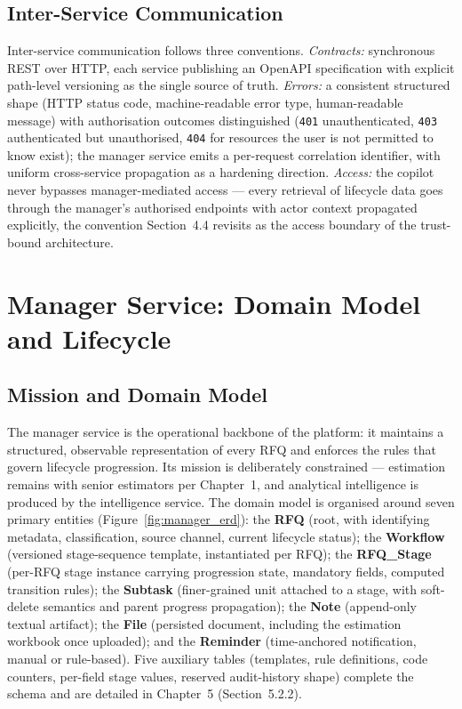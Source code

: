\subsection{Inter-Service Communication}
Inter-service communication follows three conventions. \textit{Contracts:} synchronous REST over HTTP, each service publishing an OpenAPI specification with explicit path-level versioning as the single source of truth. \textit{Errors:} a consistent structured shape (HTTP status code, machine-readable error type, human-readable message) with authorisation outcomes distinguished (\texttt{401} unauthenticated, \texttt{403} authenticated but unauthorised, \texttt{404} for resources the user is not permitted to know exist); the manager service emits a per-request correlation identifier, with uniform cross-service propagation as a hardening direction. \textit{Access:} the copilot never bypasses manager-mediated access --- every retrieval of lifecycle data goes through the manager's authorised endpoints with actor context propagated explicitly, the convention Section~4.4 revisits as the access boundary of the trust-bound architecture.

\section{Manager Service: Domain Model and Lifecycle}

\subsection{Mission and Domain Model}
The manager service is the operational backbone of the platform: it maintains a structured, observable representation of every RFQ and enforces the rules that govern lifecycle progression. Its mission is deliberately constrained --- estimation remains with senior estimators per Chapter~1, and analytical intelligence is produced by the intelligence service. The domain model is organised around seven primary entities (Figure~\ref{fig:manager_erd}): the \textbf{RFQ} (root, with identifying metadata, classification, source channel, current lifecycle status); the \textbf{Workflow} (versioned stage-sequence template, instantiated per RFQ); the \textbf{RFQ\_Stage} (per-RFQ stage instance carrying progression state, mandatory fields, computed transition rules); the \textbf{Subtask} (finer-grained unit attached to a stage, with soft-delete semantics and parent progress propagation); the \textbf{Note} (append-only textual artifact); the \textbf{File} (persisted document, including the estimation workbook once uploaded); and the \textbf{Reminder} (time-anchored notification, manual or rule-based). Five auxiliary tables (templates, rule definitions, code counters, per-field stage values, reserved audit-history shape) complete the schema and are detailed in Chapter~5 (Section~5.2.2).

